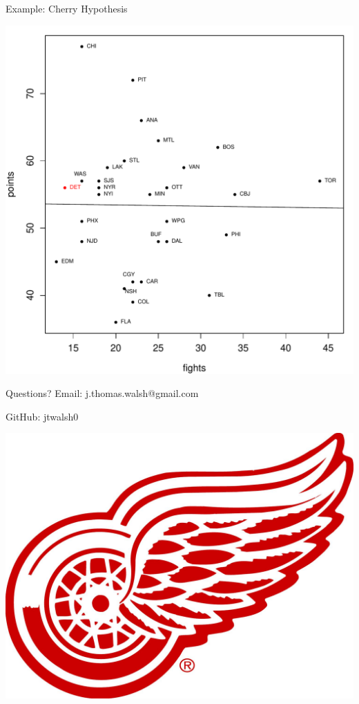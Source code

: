 \documentclass{beamer}
\begin{document}
\begin{frame}{Example: Cherry Hypothesis}
  \begin{center}
    \includegraphics[scale=.45]{"cherry hypothesis"}
  \end{center}
\end{frame}





\begin{frame}{Questions?}
Email: j.thomas.walsh@gmail.com

GitHub: jtwalsh0

  \begin{center}
    \includegraphics[scale=.20]{"DRW Logo"}
  \end{center}
\end{frame}
\end{document}
